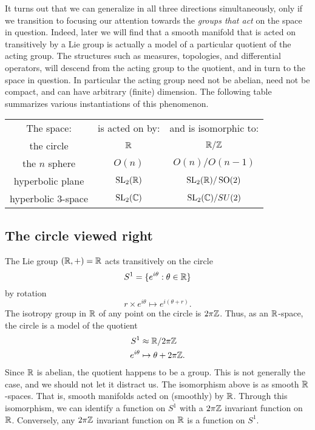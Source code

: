 \documentclass[12pt]{amsart}
\begin{document}
It turns out that we can generalize in all three directions simultaneously, only if we transition to focusing our attention towards the \emph{groups that act} on the space in question. Indeed, later we will find that a smooth manifold that is acted on transitively by a Lie group is actually a model of a particular quotient of the acting group. The structures such as measures, topologies, and differential operators, will descend from the acting group to the quotient, and in turn to the space in question. In particular the acting group need not be abelian, need not be compact, and can have arbitrary (finite) dimension. The following table summarizes various instantiations of this phenomenon.
\begin{table}
\centering	
	\begin{tabular}{c c c}
		The space: & is acted on by: & \quad and is isomorphic to: \\
		the circle & $\mathbb{R}$ & $\mathbb{R}/\mathbb{Z}$ \\
		the $n$ sphere & $O(n)$ & $O(n)/O(n-1)$ \\
		hyperbolic plane & $\operatorname{SL}_2(\mathbb{R})$ & $\operatorname{SL}_2(\mathbb{R}) / \operatorname{SO}(2)$ \\
		hyperbolic $3$-space & $\operatorname{SL}_2(\mathbb{C})$ & $\operatorname{SL}_2(\mathbb{C}) / SU(2)$ \\
	\end{tabular} 
\end{table}
\subsection{The circle viewed right}
	The Lie group $(\mathbb{R},+)=\mathbb{R}$ acts transitively on the circle
		\begin{equation*}
		S^1=\{e^{i\theta}: \theta\in\mathbb{R}\}
		\end{equation*}
	by rotation 
		\begin{equation*}
			r\times e^{i\theta}\mapsto e^{i(\theta+r)}.
		\end{equation*}
	The isotropy group in $\mathbb{R}$ of any point on the circle is $2\pi \mathbb{Z}$. Thus, as an $\mathbb{R}$-space, the circle is a model of the quotient
		\begin{align*}
			S^1 &\approx \mathbb{R} / 2\pi \mathbb{Z} \\
			e^{i\theta} &\mapsto \theta+2\pi \mathbb{Z}.
		\end{align*}
	Since $\mathbb{R}$ is abelian, the quotient happens to be a group. This is not generally the case, and we should not let it distract us. The isomorphism above is as smooth $\mathbb{R}$-spaces. That is, smooth manifolds acted on (smoothly) by $\mathbb{R}$. Through this isomorphism, we can identify a function on $S^1$ with a $2\pi \mathbb{Z}$ invariant function on $\mathbb{R}$. Conversely, any $2\pi \mathbb{Z}$ invariant function on $\mathbb{R}$ is a function on $S^1$.
	
\end{document}
